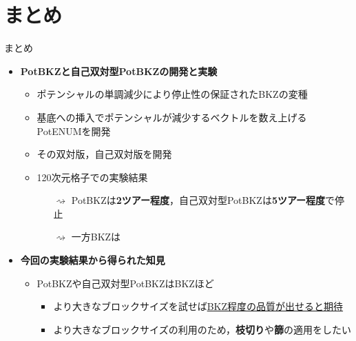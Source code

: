 \documentclass[12pt,aspectratio=169,xcolor=dvipsnames,table,dvipdfmx, leqno]{beamer}
\begin{document}
\section{まとめ}
\begin{frame}{まとめ}
\begin{itemize}
    \item \textbf{PotBKZと自己双対型PotBKZの開発と実験}
    \begin{itemize}
        \item ポテンシャルの単調減少により停止性の保証されたBKZ\cite{SE94}の変種
        \item 基底への挿入でポテンシャルが減少するベクトルを数え上げるPotENUMを開発
        \item その双対版，自己双対版を開発
        \item 120次元格子での実験結果\\
        \begin{itemize}
            \item[$\rightsquigarrow$] \alert{PotBKZは\textbf{2ツアー程度}，自己双対型PotBKZは\textbf{5ツアー程度}で停止}
            \item[$\rightsquigarrow$] 一方BKZは
        \end{itemize}
    \end{itemize}
    \item \textbf{今回の実験結果から得られた知見}
    \begin{itemize}
        \item PotBKZや自己双対型PotBKZはBKZほど
        \begin{itemize}
            \item より大きなブロックサイズを試せば\uline{BKZ程度の品質が出せると期待}
            \item より大きなブロックサイズの利用のため，\textbf{枝切り}や\textbf{篩}の適用をしたい
        \end{itemize}
    \end{itemize}
\end{itemize}
\end{frame}
\end{document}

